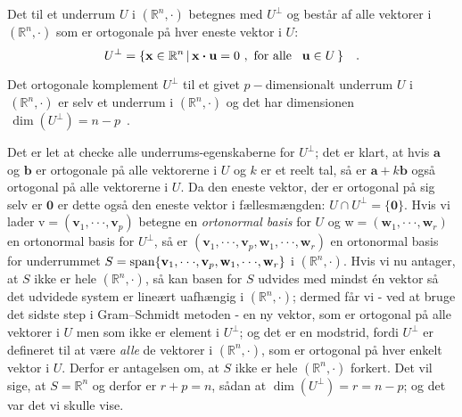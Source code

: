 \begin{definition}
Det  til et underrum $U$ i $(\mathbb{R}^{n}, \bm{\cdot})$ betegnes med $U^{\bot}$ og består af alle vektorer i $(\mathbb{R}^{n}, \bm{\cdot})$ som er ortogonale på hver eneste vektor i $U$:
\begin{equation}
U^{\bot} = \{ \mathbf{x} \in \mathbb{R}^{n} \, | \, \mathbf{x} \bm{\cdot} \mathbf{u} = 0 \, \, , \, \,\textrm{for alle \, $\mathbf{u} \in U$} \, \} \quad .
\end{equation}
\end{definition}

\begin{theorem}
Det ortogonale komplement $U^{\bot}$ til et givet $p-$dimensionalt underrum $U$ i $\,(\mathbb{R}^{n}, \bm{\cdot})$ er selv et underrum i $(\mathbb{R}^{n}, \bm{\cdot})$ og det har dimensionen $\, \dim(U^{\bot}) = n-p \, $ .
\end{theorem}
\begin{bevis}
Det er let at checke alle underrums-egenskaberne for $U^{\bot}$; det er klart, at hvis $\mathbf{a}$ og $\mathbf{b}$ er ortogonale på alle vektorerne i $U$ og $k$ er et reelt tal,  så er $\mathbf{a} + k\mathbf{b}$ også ortogonal på alle vektorerne i $U$. Da den eneste vektor, der er ortogonal på sig selv er $\mathbf{0}$ er dette også den eneste vektor i fællesmængden: $U \cap U^{\bot} = \{ \mathbf{0} \}$. Hvis vi lader v$= ( \mathbf{v}_{1}, \cdot \cdot \cdot , \mathbf{v}_{p}) $ betegne en {\em{ortonormal basis}} for  $U$ og w$ = ( \mathbf{w}_{1}, \cdot \cdot \cdot , \mathbf{w}_{r})$ en ortonormal basis for $U^{\bot}$, så er  $(  \mathbf{v}_{1}, \cdot \cdot \cdot , \mathbf{v}_{p}, \mathbf{w}_{1}, \cdot \cdot \cdot , \mathbf{w}_{r})$ en ortonormal basis for underrummet $S = \mathrm{span}\{\mathbf{v}_{1}, \cdot \cdot \cdot , \mathbf{v}_{p}, \mathbf{w}_{1}, \cdot \cdot \cdot , \mathbf{w}_{r}\}$ i $(\mathbb{R}^{n}, \bm{\cdot})$. Hvis vi nu antager, at  $S$ ikke er hele $(\mathbb{R}^{n}, \bm{\cdot})$, så kan basen for $S$ udvides med mindst \'{e}n vektor så det udvidede system er lineært uafhængig i $(\mathbb{R}^{n}, \bm{\cdot})$; dermed får vi - ved at bruge det sidste step i Gram--Schmidt metoden - en ny vektor, som er ortogonal på alle vektorer i $U$ men som ikke er element i $U^{\bot}$; og det er en modstrid, fordi  $U^{\bot}$ er defineret til at være {\em{alle}} de vektorer i $(\mathbb{R}^{n}, \bm{\cdot})$, som er ortogonal på hver enkelt vektor i $U$. Derfor er antagelsen om, at $S$ ikke er hele $(\mathbb{R}^{n}, \bm{\cdot})$ forkert. Det vil sige, at $S = \mathbb{R}^{n}$ og derfor er $r + p = n$, sådan at $\dim(U^{\bot}) = r = n-p$; og det var det vi skulle vise.
\end{bevis}

